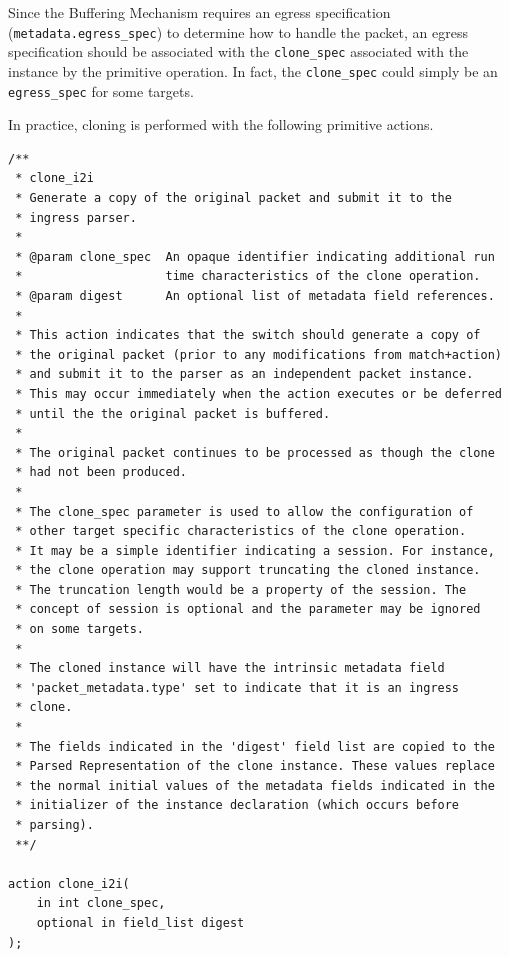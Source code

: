 \documentclass[12pt]{article}
\begin{document}
Since the Buffering Mechanism requires an egress specification
(\texttt{metadata.egress_spec}) to determine how to handle the packet, an egress
specification should be associated with the \texttt{clone_spec} associated with
the instance by the primitive operation. In fact, the \texttt{clone_spec} could
simply be an \texttt{egress_spec} for some targets.

In practice, cloning is performed with the following primitive actions.

\begin{lstlisting}[style=P4style]
/**
 * clone_i2i
 * Generate a copy of the original packet and submit it to the
 * ingress parser.
 *
 * @param clone_spec  An opaque identifier indicating additional run
 *                    time characteristics of the clone operation.
 * @param digest      An optional list of metadata field references.
 *
 * This action indicates that the switch should generate a copy of
 * the original packet (prior to any modifications from match+action)
 * and submit it to the parser as an independent packet instance. 
 * This may occur immediately when the action executes or be deferred
 * until the the original packet is buffered. 
 *  
 * The original packet continues to be processed as though the clone
 * had not been produced.
 * 
 * The clone_spec parameter is used to allow the configuration of
 * other target specific characteristics of the clone operation.
 * It may be a simple identifier indicating a session. For instance,
 * the clone operation may support truncating the cloned instance.
 * The truncation length would be a property of the session. The
 * concept of session is optional and the parameter may be ignored
 * on some targets.
 * 
 * The cloned instance will have the intrinsic metadata field
 * 'packet_metadata.type' set to indicate that it is an ingress
 * clone. 
 * 
 * The fields indicated in the 'digest' field list are copied to the
 * Parsed Representation of the clone instance. These values replace
 * the normal initial values of the metadata fields indicated in the
 * initializer of the instance declaration (which occurs before
 * parsing).
 **/

action clone_i2i(
    in int clone_spec,
    optional in field_list digest
);

\end{lstlisting}
\end{document}
